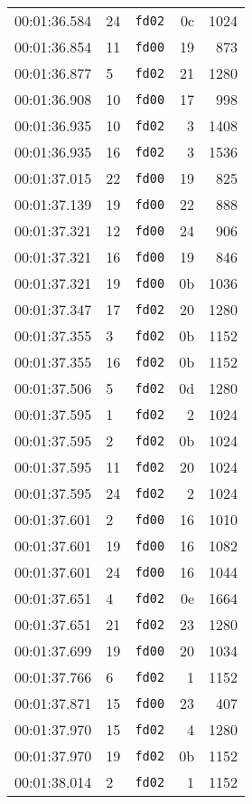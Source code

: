 \documentclass{article}
\begin{document}
\begin{longtable}{lllrr}
00:01:36.584 & 24 & \texttt{fd02} & 0c & 1024 \\
00:01:36.854 & 11 & \texttt{fd00} & 19 & 873 \\
00:01:36.877 & 5 & \texttt{fd02} & 21 & 1280 \\
00:01:36.908 & 10 & \texttt{fd00} & 17 & 998 \\
00:01:36.935 & 10 & \texttt{fd02} & 3 & 1408 \\
00:01:36.935 & 16 & \texttt{fd02} & 3 & 1536 \\
00:01:37.015 & 22 & \texttt{fd00} & 19 & 825 \\
00:01:37.139 & 19 & \texttt{fd00} & 22 & 888 \\
00:01:37.321 & 12 & \texttt{fd00} & 24 & 906 \\
00:01:37.321 & 16 & \texttt{fd00} & 19 & 846 \\
00:01:37.321 & 19 & \texttt{fd00} & 0b & 1036 \\
00:01:37.347 & 17 & \texttt{fd02} & 20 & 1280 \\
00:01:37.355 & 3 & \texttt{fd02} & 0b & 1152 \\
00:01:37.355 & 16 & \texttt{fd02} & 0b & 1152 \\
00:01:37.506 & 5 & \texttt{fd02} & 0d & 1280 \\
00:01:37.595 & 1 & \texttt{fd02} & 2 & 1024 \\
00:01:37.595 & 2 & \texttt{fd02} & 0b & 1024 \\
00:01:37.595 & 11 & \texttt{fd02} & 20 & 1024 \\
00:01:37.595 & 24 & \texttt{fd02} & 2 & 1024 \\
00:01:37.601 & 2 & \texttt{fd00} & 16 & 1010 \\
00:01:37.601 & 19 & \texttt{fd00} & 16 & 1082 \\
00:01:37.601 & 24 & \texttt{fd00} & 16 & 1044 \\
00:01:37.651 & 4 & \texttt{fd02} & 0e & 1664 \\
00:01:37.651 & 21 & \texttt{fd02} & 23 & 1280 \\
00:01:37.699 & 19 & \texttt{fd00} & 20 & 1034 \\
00:01:37.766 & 6 & \texttt{fd02} & 1 & 1152 \\
00:01:37.871 & 15 & \texttt{fd00} & 23 & 407 \\
00:01:37.970 & 15 & \texttt{fd02} & 4 & 1280 \\
00:01:37.970 & 19 & \texttt{fd02} & 0b & 1152 \\
00:01:38.014 & 2 & \texttt{fd02} & 1 & 1152 \\

\end{longtable}
\end{document}
